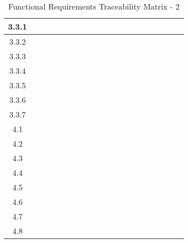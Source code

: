 \documentclass[titlepage]{article}
\begin{document}
\begin{center}
\begin{table}[h!]
\begin{tabular}{|c|c|c|c|c |c|c|c|c|c |c|c|c|c|c |c|c|c|c|c|}
3.3.1 &&&& &&&&& &&&&& &&&&&\\\hline
3.3.2 &&&& &&&&& &&&&& &&&&&\\\hline
3.3.3 &&&& &&&&& &&&&& &&&&&\\\hline
3.3.4 &&&& &&&&& &&&&& &&&&&\\\hline
3.3.5 &&&& &&&&& &&&&& &&&&&\\\hline
3.3.6 &&&& &&&&& &&&&& &&&&&\\\hline
3.3.7 &&&& &&&&& &&&&& &&&&&\\\hline
4.1 &&&& &&&&& &&&&& &&&&&\\\hline
4.2 &&&& &&&&& &&&&& &&&&&\\\hline
4.3 &&&& &&&&& &&&&& &&&&&\\\hline
4.4 &&&& &&&&& &&&&& &&&&&\\\hline
4.5 &&&& &&&&& &&&&& &&&&&\\\hline
4.6 &&&& &&&&& &&&&& &&&&&\\\hline
4.7 &&&& &&&&& &&&&& &&&&&\\\hline
4.8 &&&& &&&&& &&&&& &&&&&\\\hline
\end{tabular}
\caption{Functional Requirements Traceability Matrix - 2}
\end{table}
\end{center}
\newpage
\end{document}
